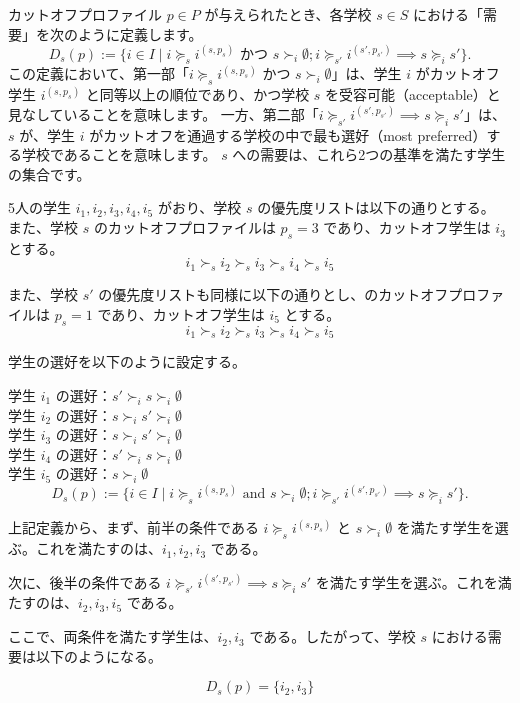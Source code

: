 \documentclass[12pt, a4paper]{article}
\theoremstyle{definition}
\theoremstyle{remark}
\theoremstyle{plain}
\begin{document}
カットオフプロファイル \( p \in P \) が与えられたとき、各学校 \( s \in S \) における「需要」を次のように定義します。
\[
  D_s(p) := \{i \in I \mid i \succeq_s i^{(s,p_s)} \text{ かつ } s \succ_i \emptyset; i \succeq_{s'} i^{(s',p_{s'})} \implies s \succeq_i s' \}.
\]
この定義において、第一部「\( i \succeq_s i^{(s,p_s)} \) かつ \( s \succ_i \emptyset \)」は、学生 \( i \) がカットオフ学生 \( i^{(s,p_s)} \) と同等以上の順位であり、かつ学校 \( s \) を受容可能（acceptable）と見なしていることを意味します。
一方、第二部「\( i \succeq_{s'} i^{(s',p_{s'})} \implies s \succeq_i s' \)」は、\( s \) が、学生 \( i \) がカットオフを通過する学校の中で最も選好（most preferred）する学校であることを意味します。
\( s \) への需要は、これら2つの基準を満たす学生の集合です。

\begin{tcolorbox}[
  colframe = black, 
  title = $D_s(p)$の数値例, 
  fonttitle = \bfseries,
  sharp corners = downhill]
  5人の学生 \( i_1, i_2, i_3, i_4, i_5 \) がおり、学校 \( s \) の優先度リストは以下の通りとする。 また、学校 \( s \) のカットオフプロファイルは \( p_s = 3 \) であり、カットオフ学生は \( i_3 \) とする。
  \[
  i_1 \succ_s i_2 \succ_s i_3 \succ_s i_4 \succ_s i_5
  \]

  また、学校 \( s' \) の優先度リストも同様に以下の通りとし、のカットオフプロファイルは \( p_s = 1 \) であり、カットオフ学生は \( i_5 \) とする。
  \[
  i_1 \succ_s i_2 \succ_s i_3 \succ_s i_4 \succ_s i_5
  \]

学生の選好を以下のように設定する。

学生 \( i_1 \) の選好：$s' \succ_i s \succ_i \emptyset$ \\
学生 \( i_2 \) の選好：$s \succ_i s' \succ_i \emptyset$ \\
学生 \( i_3 \) の選好：$s \succ_i s' \succ_i \emptyset$ \\
学生 \( i_4 \) の選好：$s' \succ_i s \succ_i \emptyset$ \\
学生 \( i_5 \) の選好：$s \succ_i \emptyset$ \\

\[
  D_s(p) := \{i \in I \mid i \succeq_s i^{(s,p_s)} \text{ and } s \succ_i \emptyset; i \succeq_{s'} i^{(s',p_{s'})} \implies s \succeq_i s' \}.
\]

上記定義から、まず、前半の条件である \( i \succeq_s i^{(s,p_s)} \) と \( s \succ_i \emptyset \) を満たす学生を選ぶ。これを満たすのは、\( i_1, i_2, i_3 \) である。

次に、後半の条件である \( i \succeq_{s'} i^{(s',p_{s'})} \implies s \succeq_i s' \) を満たす学生を選ぶ。これを満たすのは、\( i_2, i_3, i_5 \) である。

ここで、両条件を満たす学生は、\( i_2, i_3 \) である。したがって、学校 \( s \) における需要は以下のようになる。

\[
D_s(p) = \{i_2, i_3\}
\]

\end{tcolorbox}
\end{document}

